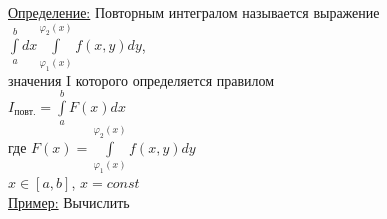 
\underline{Определение:} Повторным интегралом называется выражение \\
$\int\limits_{a}^{b} dx \int\limits_{\varphi_1(x)}^{\varphi_2(x)} f(x,y) dy$, \\
значения I которого определяется правилом \\
$I_\text{повт.} = \int\limits_{a}^{b} F(x) dx$ \\
где $F(x) = \int\limits_{\varphi_1(x)}^{\varphi_2(x)} f(x,y) dy$ \\
$x \in [a,b]$, $x = const$ \\

\underline{Пример:} Вычислить



